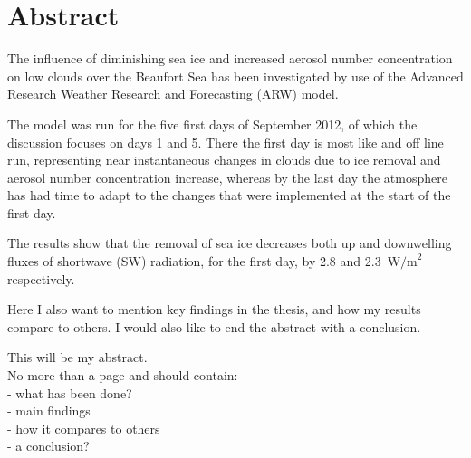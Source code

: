 \chapter*{Abstract}
The influence of diminishing sea ice and increased aerosol number concentration on low clouds over the Beaufort Sea has been investigated by use of the Advanced Research Weather Research and Forecasting (ARW) model.

The model was run for the five first days of September 2012, of which the discussion focuses on days 1 and 5. There the first day is most like and off line run, representing near instantaneous changes in clouds due to ice removal and aerosol number concentration increase, whereas by the last day the atmosphere has had time to adapt to the changes that were implemented at the start of the first day.

The results show that the removal of sea ice decreases both up and downwelling fluxes of shortwave (SW) radiation, for the first day, by 2.8 and 2.3~$\text{W/m}^2$ respectively. 

Here I also want to mention key findings in the thesis, and how my results compare to others. I would also like to end the abstract with a conclusion.


This will be my abstract. \\
No more than a page and should contain:\\
- what has been done?\\
- main findings\\
- how it compares to others\\
- a conclusion?